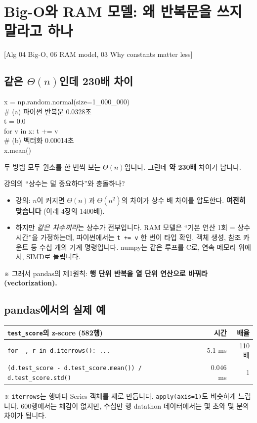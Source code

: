 \documentclass[11pt,a4paper]{article}
\newcommand{\code}[1]{\texttt{#1}}
\newcommand{\aref}[1]{{\footnotesize\textsf{\color{blue!55!black}[Alg #1]}}}
\newcommand{\aside}[1]{{\footnotesize\color{black!65}#1}}
\begin{document}
\clearpage
\clearpage

\clearpage
\renewcommand{\contentsname}{목차 (Contents)}
\tableofcontents

\section{Big-O와 RAM 모델: 왜 반복문을 쓰지 말라고 하나}
\aref{04 Big-O, 06 RAM model, 03 Why constants matter less}

\subsection{같은 $\Theta(n)$인데 230배 차이}
\begin{codebox}
x = np.random.normal(size=1\_000\_000)\\
\# (a) 파이썬 반복문 \hfill 0.0328초\\
t = 0.0\\
for v in x: t += v\\
\# (b) 벡터화 \hfill 0.00014초\\
x.mean()
\end{codebox}
두 방법 모두 원소를 한 번씩 보는 $\Theta(n)$입니다. 그런데 \textbf{약 230배} 차이가 납니다.

\begin{keybox}{강의의 ``상수는 덜 중요하다''와 충돌하나?}
\begin{itemize}
\item 강의: $n$이 커지면 $\Theta(n)$과 $\Theta(n^2)$의 차이가 상수 배 차이를 압도한다. \textbf{여전히 맞습니다} (아래 4장의 1400배).
\item 하지만 \emph{같은 차수끼리}는 상수가 전부입니다. RAM 모델은 ``기본 연산 1회 = 상수 시간''을 가정하는데, 파이썬에서는 \code{t += v} 한 번이 타입 확인, 객체 생성, 참조 카운트 등 수십 개의 기계 명령입니다. numpy는 같은 루프를 C로, 연속 메모리 위에서, SIMD로 돌립니다.
\end{itemize}
\aside{※ 그래서 pandas의 제1원칙: \textbf{행 단위 반복을 열 단위 연산으로 바꿔라 (vectorization).}}
\end{keybox}

\subsection{pandas에서의 실제 예}
\begin{center}
\begin{tabular}{@{}l r r@{}}
\toprule
\code{test\_score}의 z-score (582행) & 시간 & 배율 \\
\midrule
\code{for \_, r in d.iterrows(): ...} & 5.1 ms & 110배 \\
\code{(d.test\_score - d.test\_score.mean()) / d.test\_score.std()} & 0.046 ms & 1 \\
\bottomrule
\end{tabular}
\end{center}
\aside{※ \code{iterrows}는 행마다 Series 객체를 새로 만듭니다. \code{apply(axis=1)}도 비슷하게 느립니다. 600행에서는 체감이 없지만, 수십만 행 datathon 데이터에서는 몇 초와 몇 분의 차이가 됩니다.}
\end{document}
